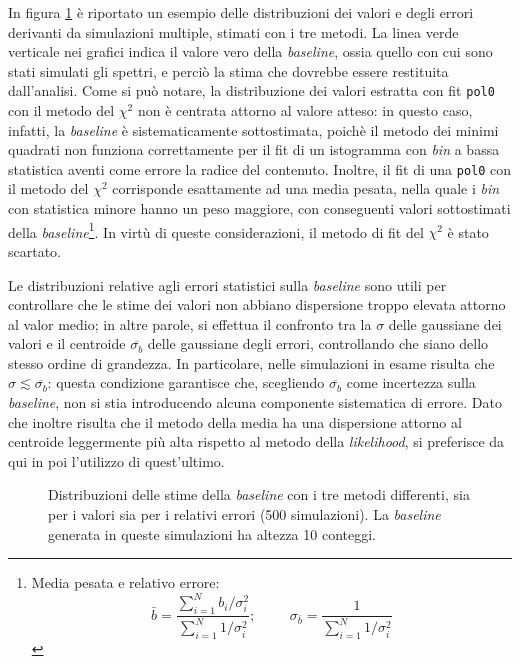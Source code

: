\documentclass[10pt, oneside, a4paper]{article}   	%
\begin{document}
In figura \ref{fig::baseline_500} è riportato un esempio delle distribuzioni dei valori e degli errori derivanti da simulazioni multiple, stimati con i tre metodi. La linea verde verticale nei grafici indica il valore vero della \textit{baseline}, ossia quello con cui sono stati simulati gli spettri, e perciò la stima che dovrebbe essere restituita dall'analisi. Come si può notare, la distribuzione dei valori estratta con fit \lstinline{pol0} con il metodo del $\chi^2$ non è centrata attorno al valore atteso: in questo caso, infatti, la \textit{baseline} è sistematicamente sottostimata, poichè il metodo dei minimi quadrati non funziona correttamente per il fit di un istogramma con \emph{bin} a bassa statistica aventi come errore la radice del contenuto. Inoltre, il fit di una \lstinline{pol0} con il metodo del $\chi^2$ corrisponde esattamente ad una media pesata, nella quale i \emph{bin} con statistica minore hanno un peso maggiore, con conseguenti valori sottostimati della \textit{baseline}\footnote{Media pesata e relativo errore:
$$\bar{b}=\frac{\sum_{i=1}^N b_i/\sigma_i^2}{\sum_{i=1}^N 1/\sigma_i^2};
\hspace{1cm} \sigma_{\bar{b}}=\frac{1}{\sum_{i=1}^N1/\sigma_i^2}$$}. In virtù di queste considerazioni, il metodo di fit del $\chi^2$ è stato scartato. 

Le distribuzioni relative agli errori statistici sulla \textit{baseline} sono utili per controllare che le stime dei valori non abbiano dispersione troppo elevata attorno al valor medio; in altre parole, si effettua il confronto tra la $\sigma$ delle gaussiane dei valori e il centroide $\overline{\sigma_{b}}$ delle gaussiane degli errori, controllando che siano dello stesso ordine di grandezza. In particolare, nelle simulazioni in esame risulta che $\sigma\lesssim \overline{\sigma_{b}}$: questa condizione garantisce che, scegliendo $\overline{\sigma_{b}}$ come incertezza sulla \textit{baseline}, non si stia introducendo alcuna componente sistematica di errore. Dato che inoltre risulta che il metodo della media ha una dispersione attorno al centroide leggermente più alta rispetto al metodo della \textit{likelihood}, si preferisce da qui in poi l'utilizzo di quest'ultimo.
%
\begin{figure}[H]
 \centerline{}
 \caption{Distribuzioni delle stime della \textit{baseline} con i tre metodi differenti, sia per i valori sia per i relativi errori (500 simulazioni). La \textit{baseline} generata in queste simulazioni ha altezza 10 conteggi.}\label{fig::baseline_500}
\end{figure}
%
\end{document}
